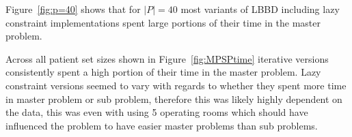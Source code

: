 Figure~\ref{fig:p=40} shows that for $|P|=40$ most variants of LBBD including lazy constraint implementations spent large portions of their time in the master problem. 

Across all patient set sizes shown in Figure~\ref{fig:MPSPtime} iterative versions consistently spent a high portion of their time in the master problem. Lazy constraint versions seemed to vary with regards to whether they spent more time in master problem or sub problem, therefore this was likely highly dependent on the data, this was even with using 5 operating rooms which should have influenced the problem to have easier master problems than sub problems\cite{roshanaei2017propagating}.